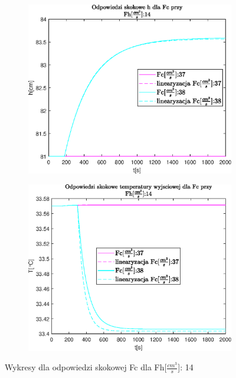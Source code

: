 \begin{figure}[h!]
   \centering
   \begin{subfigure}[b]{0.4\textwidth}
      \includegraphics[width=1\linewidth]{img/small-step-responses-fc/stepResponseHFc.eps}
      \caption{}
      \label{fig:fig:stepResponsesFc141}
   \end{subfigure}
       
   \begin{subfigure}[b]{0.4\textwidth}
      \includegraphics[width=1\linewidth]{img/small-step-responses-fc/stepResponseToutFh.eps}
      \caption{}
      \label{fig:fig:stepResponsesFc142}
   \end{subfigure}
       
   \caption{Wykresy dla odpowiedzi skokowej Fc dla Fh[$\frac{cm^3}{s}$]: 14}
   \label{fig:stepResponsesFc14}
\end{figure}
           
